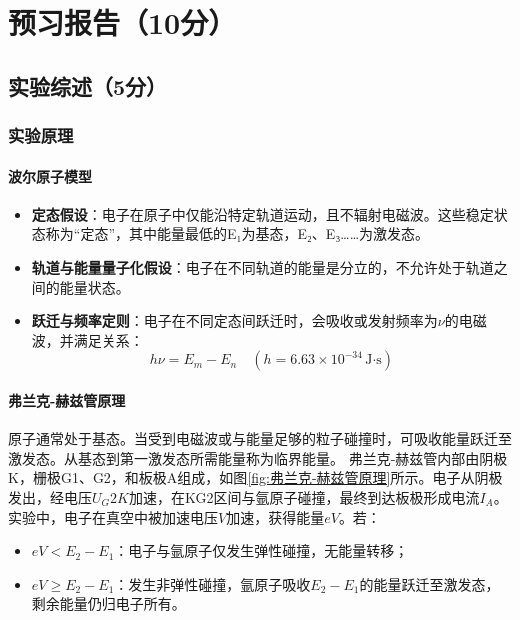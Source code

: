 \documentclass[]{../../templates/Report}%
\begin{document}
\maketitle%

\section{预习报告（10分）}
\subsection{实验综述（5分）}

\subsubsection{实验原理}
\paragraph{波尔原子模型}
\begin{itemize}
\item \textbf{定态假设}：电子在原子中仅能沿特定轨道运动，且不辐射电磁波。这些稳定状态称为“定态”，其中能量最低的E₁为基态，E₂、E₃……为激发态。
\item \textbf{轨道与能量量子化假设}：电子在不同轨道的能量是分立的，不允许处于轨道之间的能量状态。
\item \textbf{跃迁与频率定则}：电子在不同定态间跃迁时，会吸收或发射频率为$\nu$的电磁波，并满足关系：
\begin{equation}
	h\nu = E_m - E_n \quad (h = 6.63 \times 10^{-34} \, \text{J·s})
\end{equation}
\end{itemize}

\paragraph{弗兰克-赫兹管原理}
原子通常处于基态。当受到电磁波或与能量足够的粒子碰撞时，可吸收能量跃迁至激发态。从基态到第一激发态所需能量称为临界能量。
弗兰克-赫兹管内部由阴极K，栅极G1、G2，和板极A组成，如图\ref{fig:弗兰克-赫兹管原理}所示。电子从阴极发出，经电压$U_G2K$加速，在KG2区间与氩原子碰撞，最终到达板极形成电流$I_A$。
实验中，电子在真空中被加速电压$V$加速，获得能量$eV$。若：
\begin{itemize}
\item $eV < E_2 - E_1$：电子与氩原子仅发生弹性碰撞，无能量转移；
\item $eV \geq E_2 - E_1$：发生非弹性碰撞，氩原子吸收$E_2 - E_1$的能量跃迁至激发态，剩余能量仍归电子所有。
\end{itemize}
\end{document}

